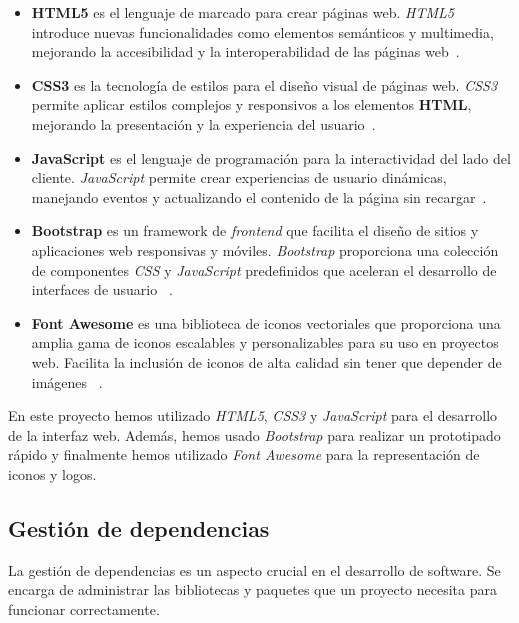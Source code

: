 \begin{itemize}
    \item
    \textbf{HTML5} es el lenguaje de marcado para crear páginas web.
    \textit{HTML5} introduce nuevas funcionalidades como elementos semánticos y multimedia, mejorando la
    accesibilidad y la interoperabilidad de las páginas web~\cite{url_html5}.

    \item
    \textbf{CSS3} es la tecnología de estilos para el diseño visual de páginas web.
    \textit{CSS3} permite aplicar estilos complejos y responsivos a los elementos \textbf{HTML}, mejorando la
    presentación y la experiencia del usuario~\cite{url_css3}.

    \item
    \textbf{JavaScript} es el lenguaje de programación para la interactividad del lado del cliente.
    \textit{JavaScript} permite crear experiencias de usuario dinámicas, manejando eventos y actualizando el
    contenido de la página sin recargar~\cite{url_javascript}.

    \item
    \textbf{Bootstrap} es un framework de \textit{frontend} que facilita el diseño de sitios y aplicaciones web
    responsivas y móviles.
    \textit{Bootstrap} proporciona una colección de componentes \textit{CSS} y \textit{JavaScript}
    predefinidos que aceleran el desarrollo de interfaces de usuario ~\cite{url_bootstrap}.

    \item \textbf{Font Awesome}
    es una biblioteca de iconos vectoriales que proporciona una amplia gama de iconos escalables y personalizables para
    su uso en proyectos web.
    Facilita la inclusión de iconos de alta calidad sin tener que depender de imágenes ~\cite{url_fontawesome}.
\end{itemize}

En este proyecto hemos utilizado \textit{HTML5}, \textit{CSS3} y \textit{JavaScript} para el desarrollo de la interfaz
web.
Además, hemos usado \textit{Bootstrap} para realizar un prototipado rápido y finalmente hemos utilizado
\textit{Font Awesome} para la representación de iconos y logos.

\subsection*{Gestión de dependencias}

La gestión de dependencias es un aspecto crucial en el desarrollo de software.
Se encarga de administrar las bibliotecas y paquetes que un proyecto necesita para funcionar correctamente.

